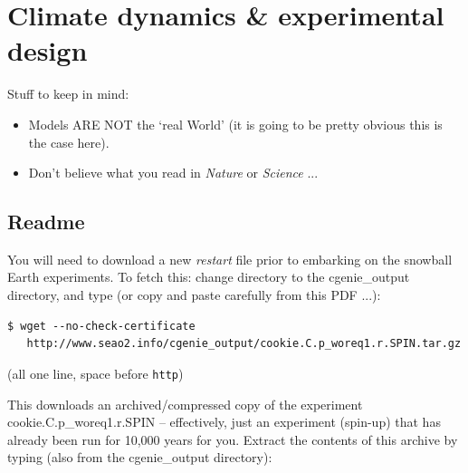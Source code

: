 
\cleardoublepage


\chapter{Climate dynamics \& experimental design}\label{ch:climate-dynamics}

\hfill \break

\noindent Stuff to keep in mind:

\vspace{2mm}
\begin{itemize}
\item Models ARE NOT the ‘real World’ (it is going to be pretty obvious this is the case here).
\item Don’t believe what you read in \textit{Nature} or \textit{Science} ...
\end{itemize}

\newpage

\section*{Readme}

You will need to download a new \textit{restart} file prior to embarking on the snowball Earth experiments.
To fetch this: change directory to the \textsf{\footnotesize cgenie\_output} directory, and type (or copy and paste carefully from this PDF ...):

\vspace{-2mm}\small\begin{verbatim}
$ wget --no-check-certificate 
   http://www.seao2.info/cgenie_output/cookie.C.p_woreq1.r.SPIN.tar.gz
\end{verbatim}\normalsize\vspace{-2mm}
(all one line, space before \texttt{\small http})

\vspace{1mm}
This downloads an archived/compressed copy of the experiment \textsf{\footnotesize cookie.C.p\_woreq1.r.SPIN} – effectively, just an experiment (spin-up) that has already been run for 10,000 years for you. Extract the contents of this archive by typing (also from the \textsf{\footnotesize cgenie\_output} directory):

